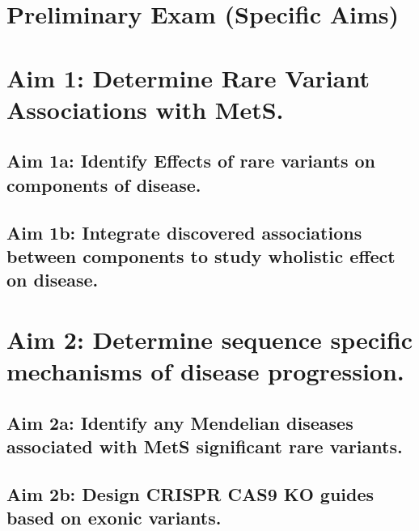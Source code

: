 \documentclass[11pt]{article}
\begin{document}
\section*{Preliminary Exam (Specific Aims)}



\section*{Aim 1: Determine Rare Variant Associations with MetS.}

\subsection*{Aim 1a: Identify Effects of rare variants on components of disease.}

\subsection*{Aim 1b: Integrate discovered associations between components to study wholistic effect on disease.}

\section*{Aim 2: Determine sequence specific mechanisms of disease progression.}

\subsection*{Aim 2a: Identify any Mendelian diseases associated with MetS significant rare variants.}

\subsection*{Aim 2b: Design CRISPR CAS9 KO guides based on exonic variants.}
\end{document}

